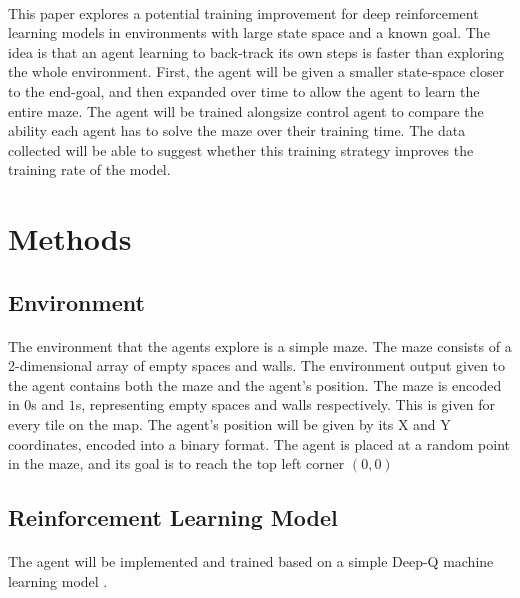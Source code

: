 \documentclass[12pt]{article}
\begin{document}

\paragraph{}
This paper explores a potential training improvement for deep reinforcement learning models in environments with large state space and a known goal.
The idea is that an agent learning to back-track its own steps is faster than exploring the whole environment.
First, the agent will be given a smaller state-space closer to the end-goal, and then expanded over time to allow the agent to learn the entire maze.
The agent will be trained alongsize control agent to compare the ability each agent has to solve the maze over their training time.
The data collected will be able to suggest whether this training strategy improves the training rate of the model.


\section{Methods}

\subsection{Environment}

\paragraph{} 
The environment that the agents explore is a simple maze.
The maze consists of a 2-dimensional array of empty spaces and walls.
The environment output given to the agent contains both the maze and the agent's position.
The maze is encoded in $0$s and $1$s, representing empty spaces and walls respectively.
This is given for every tile on the map.
The agent's position will be given by its X and Y coordinates, encoded into a binary format.
The agent is placed at a random point in the maze, and its goal is to reach the top left corner $(0,0)$

\subsection{Reinforcement Learning Model}

\paragraph{}
The agent will be implemented and trained based on a simple Deep-Q machine learning model \cite{article_reinforcement_learning_survey}.
\end{document}
